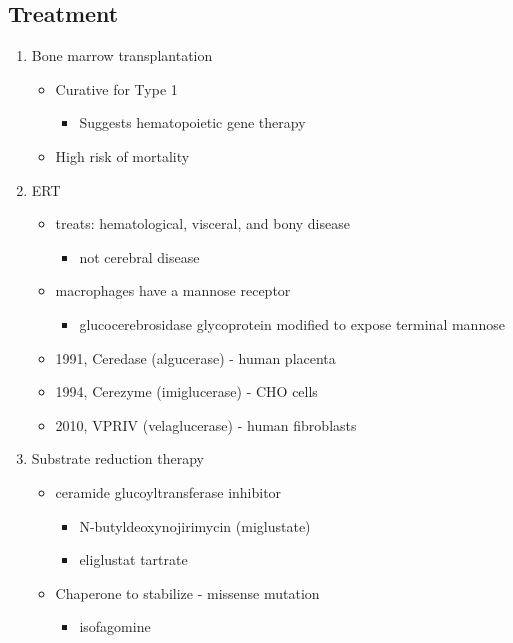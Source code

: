 \documentclass{scrartcl}
\begin{document}
\subsection{Treatment}
\label{sec:org222491f}
\begin{enumerate}
\item Bone marrow transplantation
\label{sec:org68077e1}
\begin{itemize}
\item Curative for Type 1
\begin{itemize}
\item Suggests hematopoietic gene therapy
\end{itemize}
\item High risk of mortality
\end{itemize}
\item ERT
\label{sec:orgd5add85}
\begin{itemize}
\item treats: hematological, visceral, and bony disease
\begin{itemize}
\item not cerebral disease
\end{itemize}
\item macrophages have a mannose receptor
\begin{itemize}
\item glucocerebrosidase glycoprotein modified to expose terminal mannose
\end{itemize}
\item 1991, Ceredase (algucerase) - human placenta
\item 1994, Cerezyme (imiglucerase) - CHO cells
\item 2010, VPRIV (velaglucerase) - human fibroblasts
\end{itemize}

\item Substrate reduction therapy
\label{sec:orge05d318}
\begin{itemize}
\item ceramide glucoyltransferase inhibitor
\begin{itemize}
\item N-butyldeoxynojirimycin (miglustate)
\item eliglustat tartrate
\end{itemize}
\item Chaperone to stabilize - missense mutation
\begin{itemize}
\item isofagomine
\end{itemize}
\end{itemize}
\end{enumerate}
\end{document}
